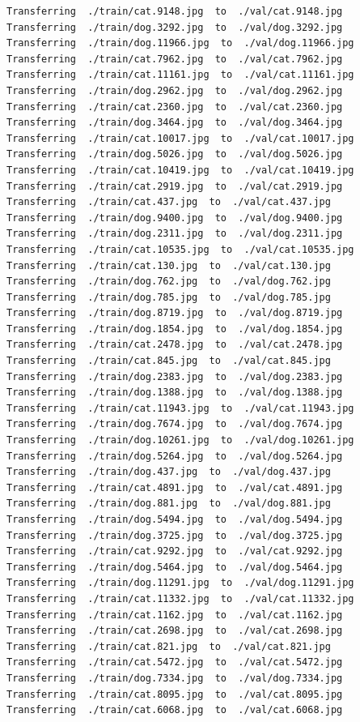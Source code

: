 \documentclass[]{book}
\theoremstyle{definition}
\theoremstyle{definition}
\theoremstyle{definition}
\theoremstyle{remark}
\begin{document}
\begin{verbatim}
Transferring  ./train/cat.9148.jpg  to  ./val/cat.9148.jpg
Transferring  ./train/dog.3292.jpg  to  ./val/dog.3292.jpg
Transferring  ./train/dog.11966.jpg  to  ./val/dog.11966.jpg
Transferring  ./train/cat.7962.jpg  to  ./val/cat.7962.jpg
Transferring  ./train/cat.11161.jpg  to  ./val/cat.11161.jpg
Transferring  ./train/dog.2962.jpg  to  ./val/dog.2962.jpg
Transferring  ./train/cat.2360.jpg  to  ./val/cat.2360.jpg
Transferring  ./train/dog.3464.jpg  to  ./val/dog.3464.jpg
Transferring  ./train/cat.10017.jpg  to  ./val/cat.10017.jpg
Transferring  ./train/dog.5026.jpg  to  ./val/dog.5026.jpg
Transferring  ./train/cat.10419.jpg  to  ./val/cat.10419.jpg
Transferring  ./train/cat.2919.jpg  to  ./val/cat.2919.jpg
Transferring  ./train/cat.437.jpg  to  ./val/cat.437.jpg
Transferring  ./train/dog.9400.jpg  to  ./val/dog.9400.jpg
Transferring  ./train/dog.2311.jpg  to  ./val/dog.2311.jpg
Transferring  ./train/cat.10535.jpg  to  ./val/cat.10535.jpg
Transferring  ./train/cat.130.jpg  to  ./val/cat.130.jpg
Transferring  ./train/dog.762.jpg  to  ./val/dog.762.jpg
Transferring  ./train/dog.785.jpg  to  ./val/dog.785.jpg
Transferring  ./train/dog.8719.jpg  to  ./val/dog.8719.jpg
Transferring  ./train/dog.1854.jpg  to  ./val/dog.1854.jpg
Transferring  ./train/cat.2478.jpg  to  ./val/cat.2478.jpg
Transferring  ./train/cat.845.jpg  to  ./val/cat.845.jpg
Transferring  ./train/dog.2383.jpg  to  ./val/dog.2383.jpg
Transferring  ./train/dog.1388.jpg  to  ./val/dog.1388.jpg
Transferring  ./train/cat.11943.jpg  to  ./val/cat.11943.jpg
Transferring  ./train/dog.7674.jpg  to  ./val/dog.7674.jpg
Transferring  ./train/dog.10261.jpg  to  ./val/dog.10261.jpg
Transferring  ./train/dog.5264.jpg  to  ./val/dog.5264.jpg
Transferring  ./train/dog.437.jpg  to  ./val/dog.437.jpg
Transferring  ./train/cat.4891.jpg  to  ./val/cat.4891.jpg
Transferring  ./train/dog.881.jpg  to  ./val/dog.881.jpg
Transferring  ./train/dog.5494.jpg  to  ./val/dog.5494.jpg
Transferring  ./train/dog.3725.jpg  to  ./val/dog.3725.jpg
Transferring  ./train/cat.9292.jpg  to  ./val/cat.9292.jpg
Transferring  ./train/dog.5464.jpg  to  ./val/dog.5464.jpg
Transferring  ./train/dog.11291.jpg  to  ./val/dog.11291.jpg
Transferring  ./train/cat.11332.jpg  to  ./val/cat.11332.jpg
Transferring  ./train/cat.1162.jpg  to  ./val/cat.1162.jpg
Transferring  ./train/cat.2698.jpg  to  ./val/cat.2698.jpg
Transferring  ./train/cat.821.jpg  to  ./val/cat.821.jpg
Transferring  ./train/cat.5472.jpg  to  ./val/cat.5472.jpg
Transferring  ./train/dog.7334.jpg  to  ./val/dog.7334.jpg
Transferring  ./train/cat.8095.jpg  to  ./val/cat.8095.jpg
Transferring  ./train/cat.6068.jpg  to  ./val/cat.6068.jpg

\end{verbatim}
\end{document}
